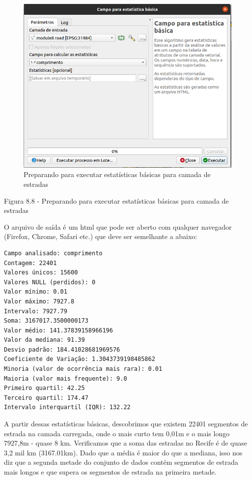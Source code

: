 \documentclass[
]{book}
\begin{document}
\begin{figure}
\centering
\includegraphics{media/modulo8/fig88.png}
\caption{Preparando para executar estatísticas básicas para camada de estradas}
\end{figure}

Figura 8.8 - Preparando para executar estatísticas básicas para camada de estradas

O arquivo de saída é um html que pode ser aberto com qualquer navegador (Firefox, Chrome, Safari etc.) que deve ser semelhante a abaixo:

\begin{verbatim}
Campo analisado: comprimento
Contagem: 22401
Valores únicos: 15600
Valores NULL (perdidos): 0
Valor mínimo: 0.01
Valor máximo: 7927.8
Intervalo: 7927.79
Soma: 3167017.3500000173
Valor médio: 141.37839158966196
Valor da mediana: 91.39
Desvio padrão: 184.41028681969576
Coeficiente de Variação: 1.3043739198485862
Minoria (valor de ocorrência mais rara): 0.01
Maioria (valor mais frequente): 9.0
Primeiro quartil: 42.25
Terceiro quartil: 174.47
Intervalo interquartil (IQR): 132.22
\end{verbatim}

A partir dessas estatísticas básicas, descobrimos que existem 22401 segmentos de estrada na camada carregada, onde o mais curto tem 0,01m e o mais longo 7927,8m - quase 8 km. Verificamos que a soma das estradas no Recife é de quase 3,2 mil km (3167.01km). Dado que a média é maior do que a mediana, isso nos diz que a segunda metade do conjunto de dados contém segmentos de estrada mais longos e que supera os segmentos de estrada na primeira metade.
\end{document}
